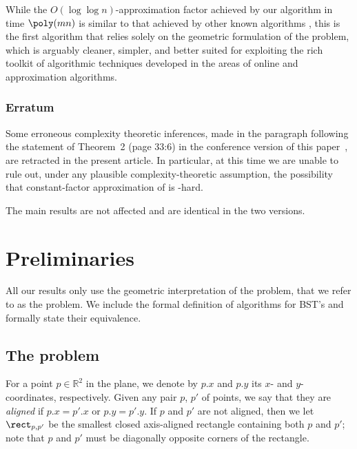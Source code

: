 \documentclass[11pt]{article}
\numberwithin{equation}{section}
\theoremstyle{definition}
\theoremstyle{plain}
\begin{document}
While the $O(\log\log n)$-approximation factor achieved by our algorithm in time $\poly(mn)$ is similar to that achieved by other known algorithms  \cite{tango,chain_splay,multisplay}, this is the first algorithm that relies solely on the geometric formulation of the problem, which is arguably cleaner, simpler, and better suited for exploiting the rich toolkit of algorithmic techniques developed in the areas of online and approximation algorithms.

\subsubsection{Erratum} 
Some erroneous complexity theoretic inferences, made
%
%
in the paragraph following the statement of Theorem~2 (page 33:6) %
in the conference version of this paper~\cite{conf-version}, %
are retracted in the present article.  
%
In particular, at this time we are unable to rule out, under any
plausible complexity-theoretic assumption, the possibility
that constant-factor approximation of \minsat is \NP-hard.  %
%
%

The main results are not affected and are identical in the two versions. 

%

\section{Preliminaries}\label{sec: prelims}

%

All our results only use the geometric interpretation of the problem, that we refer to as the \minsat problem. 
We include the formal definition of algorithms for BST's and formally state their equivalence.  
%


%

	\subsection{The \minsat problem}
	\label{sec: problem def}

	For a point $p \in {\mathbb R}^2$ in the plane, we denote by $p.x$ and $p.y$ its $x$- and $y$-coordinates, respectively. 
	Given any pair $p$, $p'$ of points, we say that they are \emph{aligned} if $p.x=p'.x$ or $p.y=p'.y$. If $p$ and $p'$ are not aligned, then we let $\rect_{p,p'}$ be the smallest closed axis-aligned rectangle containing both $p$ and $p'$; note that $p$ and $p'$ must be diagonally opposite corners of the rectangle.
	 
\end{document}
